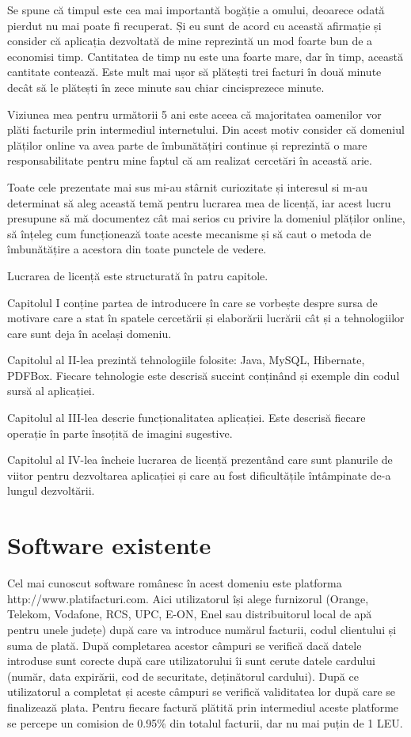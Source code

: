 \documentclass[12pt]{book}
\begin{document}
Se spune că timpul este cea mai importantă bogăție a omului, deoarece odată pierdut nu mai poate fi recuperat. Și eu sunt de acord cu această afirmație și consider că  aplicația dezvoltată de mine reprezintă un mod foarte bun de a economisi timp. Cantitatea de timp nu este una foarte mare, dar în timp, această cantitate contează. Este mult mai ușor să plătești trei facturi în două minute decât să le plătești în zece minute sau chiar cincisprezece minute.

Viziunea mea pentru următorii 5 ani este aceea că majoritatea oamenilor vor plăti facturile prin intermediul internetului. Din acest motiv consider că domeniul plăților online va avea parte de îmbunătățiri continue și reprezintă o mare responsabilitate pentru mine faptul că am realizat cercetări în această arie.

Toate cele prezentate mai sus mi-au stârnit curiozitate și interesul si m-au determinat să aleg această temă pentru lucrarea mea de licență, iar acest lucru presupune să mă documentez cât mai serios cu privire la domeniul plăților online, să înțeleg cum funcționează toate aceste mecanisme și să caut o metoda de îmbunătățire a acestora din toate punctele de vedere. 

Lucrarea de licență este structurată în patru capitole.

Capitolul I conține partea de introducere în care se vorbește despre sursa de motivare care a stat în spatele cercetării și elaborării lucrării cât și a tehnologiilor care sunt deja în același domeniu.

Capitolul al II-lea prezintă tehnologiile folosite: Java, MySQL, Hibernate, PDFBox. Fiecare tehnologie este descrisă succint conținând și exemple din codul sursă al aplicației.

Capitolul al III-lea descrie funcționalitatea aplicației. Este descrisă fiecare operație în parte însoțită de imagini sugestive. 

Capitolul al IV-lea încheie lucrarea de licență prezentând care sunt planurile de viitor pentru dezvoltarea aplicației și care au fost dificultățile întâmpinate de-a lungul dezvoltării.
\section{Software existente}

Cel mai cunoscut software românesc în acest domeniu este platforma http://www.platifacturi.com. Aici utilizatorul își alege furnizorul (Orange, Telekom, Vodafone, RCS, UPC, E-ON, Enel sau distribuitorul local de apă pentru unele județe) după care va introduce numărul facturii, codul clientului și suma de plată. După completarea acestor câmpuri se verifică dacă datele introduse sunt corecte după care utilizatorului îi sunt cerute datele cardului (număr, data expirării, cod de securitate, deținătorul cardului). După ce utilizatorul a completat și aceste câmpuri se verifică validitatea lor după care se finalizează plata. Pentru fiecare factură plătită prin intermediul aceste platforme se percepe un comision de 0.95\% din totalul facturii, dar nu mai puțin de 1 LEU. 
\end{document}
